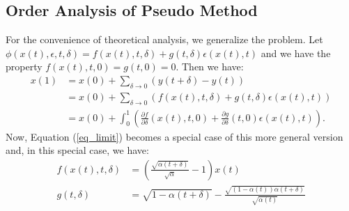 \documentclass{article}
\begin{document}
\subsection{Order Analysis of Pseudo Method}
\label{ap_oapm}
For the convenience of theoretical analysis, we generalize the problem. Let $\phi(x(t), \epsilon, t, \delta)=f(x(t),t,\delta)+g(t,\delta)\epsilon(x(t),t)$ and we have the property $f(x(t),t,0)=g(t,0)=0$. Then we have:
\begin{equation}
   \begin{split}
       x(1) &= x(0) + \sum_{\delta\to 0}(y(t+\delta) - y(t)) \\
            &= x(0) + \sum_{\delta\to 0}\left(f(x(t),t,\delta)+g(t,\delta)\epsilon(x(t),t)\right) \\
            &= x(0) + \int_0^1\left(\frac{\partial f}{\partial \delta}(x(t),t,0)+\frac{\partial g}{\partial \delta}(t,0)\epsilon(x(t),t)\right).
   \end{split}
\end{equation}
Now, Equation (\ref{eq_limit}) becomes a special case of this more general version and, in this special case, we have:
\begin{equation}
   \begin{split}
      f(x(t),t,\delta)&=\left(\frac{\sqrt{\alpha(t+\delta)}}{\sqrt{\alpha}}-1\right)x(t) \\
      g(t, \delta)&=\sqrt{1-\alpha(t+\delta)} - \frac{\sqrt{(1-\alpha(t))\alpha(t+\delta)}}{\sqrt{\alpha(t)}}
   \end{split}
\end{equation}
\end{document}
